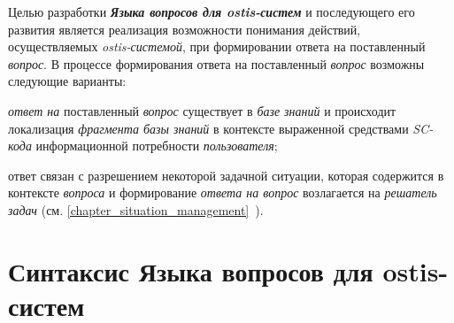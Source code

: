 Целью разработки \textbf{\textit{Языка вопросов для ostis-систем}} и последующего его развития является реализация возможности понимания действий, осуществляемых \textit{ostis-системой}, при формировании ответа на поставленный \textit{вопрос}. В процессе формирования ответа на поставленный \textit{вопрос} возможны следующие варианты:
\begin{textitemize}
	\item \textit{ответ на} поставленный \textit{вопрос} существует в \textit{базе знаний} и происходит локализация \textit{фрагмента базы знаний} в контексте выраженной средствами \textit{SC-кода} информационной потребности \textit{пользователя};
	\item ответ связан с разрешением некоторой задачной ситуации, которая содержится в контексте \textit{вопроса} и формирование \textit{ответа на вопрос} возлагается на \textit{решатель задач} (см. \ref{chapter_situation_management}~).
\end{textitemize}

\begin{SCn}
\begin{scnindent}
\end{scnindent}
\begin{scnindent}
\end{scnindent}
\begin{scnindent}
\end{scnindent}
\end{SCn}

\section{Синтаксис Языка вопросов для ostis-систем}
\label{sec_requests_syntax}

